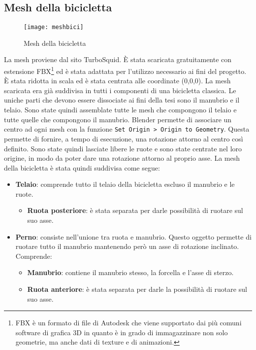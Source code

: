 \subsection{Mesh della bicicletta}
\begin{figure}[htb]
    \centering
    \texttt{[image: meshbici]}
    \caption{Mesh della bicicletta\label{fig:meshbici}}
\end{figure}
\noindent La mesh proviene dal sito TurboSquid. È stata scaricata gratuitamente con estensione FBX\footnote{FBX è un formato di file di Autodesk che viene supportato dai più comuni software di grafica 3D in quanto è in grado di immagazzinare non solo geometrie, ma anche dati di texture e di animazioni.} ed è stata adattata per l'utilizzo necessario ai fini del progetto. È stata ridotta in scala ed è stata centrata alle coordinate (0,0,0). La mesh scaricata era già suddivisa in tutti i componenti di una bicicletta classica. Le uniche parti che devono essere dissociate ai fini della tesi sono il manubrio e il telaio. Sono state quindi assemblate tutte le mesh che compongono il telaio e tutte quelle che compongono il manubrio. Blender permette di associare un centro ad ogni mesh con la funzione \texttt{Set Origin > Origin to Geometry}. Questa permette di fornire, a tempo di esecuzione, una rotazione attorno al centro così definito. Sono state quindi lasciate libere le ruote e sono state centrate nel loro origine, in modo da poter dare una rotazione attorno al proprio asse.
\noindent La mesh della bicicletta è stata quindi suddivisa come segue:
\begin{itemize}
  \item \textbf{Telaio}: comprende tutto il telaio della bicicletta escluso il manubrio e le ruote.
	\begin{itemize}
  \item \textbf{Ruota posteriore}: è stata separata per darle possibilità di ruotare sul suo asse.
 \end{itemize}
  \item \textbf{Perno}: consiste nell'unione tra ruota e manubrio. Questo oggetto permette di ruotare tutto il manubrio mantenendo però un asse di rotazione inclinato. Comprende:
 \begin{itemize}
 \item \textbf{Manubrio}: contiene il manubrio stesso, la forcella e l'asse di sterzo.
 \item \textbf{Ruota anteriore}: è stata separata per darle la possibilità di ruotare sul suo asse.
 \end{itemize}
\end{itemize}

